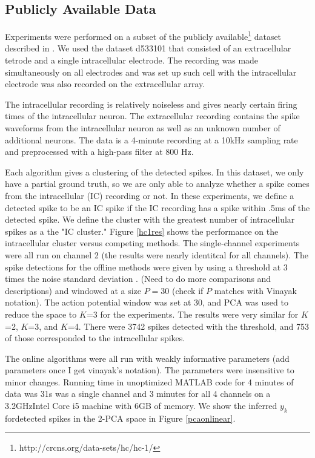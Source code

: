 \subsection{Publicly Available Data}
Experiments were performed on a subset of the publicly available\footnote{http://crcns.org/data-sets/hc/hc-1/} dataset described in \cite{Henze2000}.  We used the dataset d533101 that consisted of an extracellular tetrode and a single intracellular electrode.  The recording was made simultaneously on all electrodes and was set up such cell with the intracellular electrode was also recorded on the extracellular array. 

The intracellular recording is relatively noiseless and gives nearly certain firing times of the intracellular neuron.  The extracellular recording contains the spike waveforms from the intracellular neuron as well as an unknown number of additional neurons.  The data is a 4-minute recording at a 10kHz sampling rate and preprocessed with a high-pass filter at 800 Hz.

Each algorithm gives a clustering of the detected spikes.  In this dataset, we only have a partial ground truth, so we are only able to analyze whether a spike comes from the intracellular (IC) recording or not.  In these experiments, we define a detected spike to be an IC spike if the IC recording has a spike within .5ms of the detected spike.  We define the cluster with the greatest number of intracellular spikes as a the "IC cluster."  Figure \ref{hc1res} shows the performance on the intracellular cluster versus competing methods.  The single-channel experiments were all run on channel 2 (the results were nearly identitcal for all channels).  The spike detections for the offline methods were given by using a threshold at 3 times the noise standard deviation \cite{Lewicki}. (Need to do more comparisons and descriptions) and windowed at a size $P=30$ (check if $P$ matches with Vinayak notation).  The action potential window was set at 30, and PCA was used to reduce the space to $K$=3 for the experiments.  The results were very similar for $K$=2, $K$=3, and $K$=4.   There were 3742 spikes detected with the threshold, and 753 of those corresponded to the intracellular spikes.

The online algorithms were all run with weakly informative parameters (add parameters once I get vinayak's notation). The parameters were insensitive to minor changes.  Running time in unoptimized MATLAB code for 4 minutes of data was 31s was a single channel and 3 minutes for all 4 channels on a 3.2GHzIntel Core i5 machine with 6GB of memory.  We show the inferred $y_k$ fordetected spikes in the 2-PCA space in Figure \ref{pcaonlinear}.

